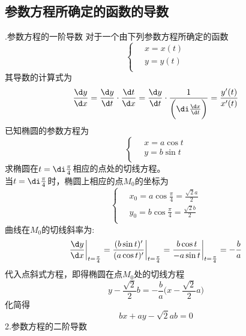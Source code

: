 \subsection{参数方程所确定的函数的导数}
.\enspace 参数方程的一阶导数
对于一个由下列参数方程所确定的函数
\begin{equation}
	\nonumber
	\left\{ \begin{aligned}
		&\, x=x(t)\\
		&\, y=y (t)\\
	\end{aligned}\right.
\end{equation}
其导数的计算式为
\begin{equation}
	\frac{\d y}{\d x}=\frac{\d y}{\d t}\cdot \frac{\d t}{\d x}=\frac{\d y}{\d t}\cdot\frac{1}{\bigg(\di\frac{\d x}{\d t}\bigg)}=\frac{y'(t)}{x'(t)}
\end{equation}
\examples 已知椭圆的参数方程为
\begin{equation}
	\nonumber
	\left\{ \begin{aligned}
		&\, x=a\cos t\\
		&\, y=b\sin t\\
	\end{aligned}\right.
\end{equation}
求椭圆在$t=\di\frac{\pi}{4}$相应的点处的切线方程。\\
\solve 当$t=\di\frac{\pi}{4}$时，椭圆上相应的点$M_0$的坐标为
\begin{equation}
	\nonumber
	\left\{ \begin{aligned}
		&\, x_0=a\cos \frac{\pi}{4}=\frac{\sqrt{2}a}{2}\\
		&\, y_0=b\cos \frac{\pi}{4}=\frac{\sqrt{2}b}{2}\\
	\end{aligned}\right.
\end{equation}
曲线在$M_0$的切线斜率为:
\begin{equation}
	\nonumber
	\frac{\d y}{\d x}\bigg|_{t=\frac{\pi}{4}}=\frac{(b\sin t)'}{(a\cos t)'}\bigg|_{t=\frac{\pi}{4}}=\frac{b\cos t}{-a\sin t}\bigg|_{t=\frac{\pi}{4}}=-\frac{b}{a}
\end{equation}
代入点斜式方程，即得椭圆在点$M_0$处的切线方程
\begin{equation}
	\nonumber
	y-\frac{\sqrt{2}}{2}b=-\frac{b}{a}\bigg(x-\frac{\sqrt{2}}{2}a\bigg)
\end{equation}
化简得
\begin{equation}
	\nonumber
	bx+ay-\sqrt{2}ab=0
\end{equation}
2.\enspace 参数方程的二阶导数
